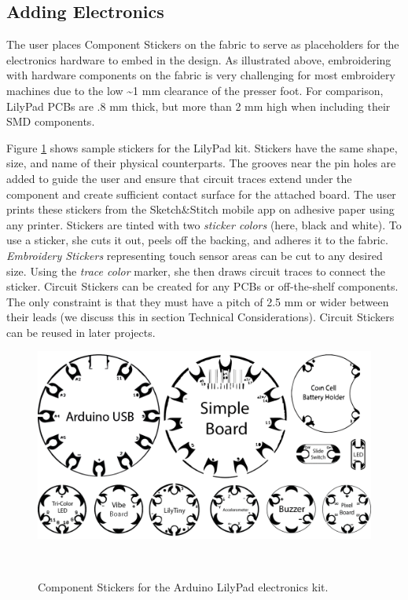 \documentclass[header.tex]{subfiles}
\begin{document}
\subsection{Adding Electronics}
The user places Component Stickers on the fabric to serve as placeholders for the electronics hardware to embed in the design. As illustrated above, embroidering with hardware components on the fabric is very challenging for most embroidery machines due to the low \textasciitilde 1 mm clearance of the presser foot. For comparison, LilyPad PCBs are .8 mm thick, but more than 2 mm high when including their SMD components.

Figure \ref{fig:ComponentStickers} shows sample stickers for the LilyPad kit. Stickers have the same shape, size, and name of their physical counterparts.  
The grooves near the pin holes are added to guide the user and ensure that circuit traces extend under the component and create sufficient contact surface for the attached board. 
The user prints these stickers from the Sketch\&Stitch mobile app on adhesive paper using any printer. Stickers are tinted with two \textit{sticker colors} (here, black and white). To use a sticker, she cuts it out, peels off the backing, and adheres it to the fabric. \emph{Embroidery Stickers} representing touch sensor areas can be cut to any desired size. Using the \textit{trace color} marker, she then draws circuit traces to connect the sticker. 
Circuit Stickers can be created for any PCBs or off-the-shelf components. The only constraint is that they must have a pitch of 2.5 mm or wider between their leads (we discuss this in section Technical Considerations). Circuit Stickers can be reused in later projects.


\begin{figure} [h!]
\centering
  \includegraphics[width=0.9\columnwidth]{figures/ComponentStickers.png}
  \caption{Component Stickers for the Arduino LilyPad electronics kit.}~\label{fig:ComponentStickers}
  \vspace{-1.5em}
\end{figure}
\end{document}
